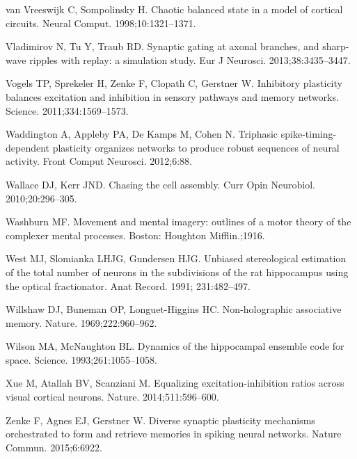 \begin{thebibliography}{}
van Vreeswijk C, Sompolinsky H.
\newblock Chaotic balanced state in a model of cortical circuits.
\newblock Neural Comput. 1998;10:1321--1371.


Vladimirov N, Tu Y, Traub RD. 
\newblock Synaptic gating at axonal branches, and sharp-wave ripples with replay: a simulation study.
\newblock Eur J Neurosci. 2013;38:3435--3447.

Vogels TP, Sprekeler H, Zenke F, Clopath C, Gerstner W.
\newblock Inhibitory plasticity balances excitation and inhibition in sensory
  pathways and memory networks.
\newblock Science. 2011;334:1569--1573.

Waddington A, Appleby PA, De Kamps M, Cohen N.
\newblock Triphasic spike-timing-dependent plasticity organizes networks to produce robust sequences of neural activity.
\newblock Front Comput Neurosci. 2012;6:88.

Wallace DJ, Kerr JND.
\newblock Chasing the cell assembly.
\newblock Curr Opin Neurobiol. 2010;20:296--305.

Washburn MF.
\newblock Movement and mental imagery: outlines of a motor theory of the
  complexer mental processes.
\newblock Boston: Houghton Mifflin.;1916.

West MJ, Slomianka LHJG, Gundersen HJG.
\newblock Unbiased stereological estimation of the total number of neurons in the subdivisions of the rat hippocampus using the optical fractionator.
\newblock Anat Record. 1991; 231:482--497.

Willshaw DJ, Buneman OP, Longuet-Higgins HC.
\newblock Non-holographic associative memory.
\newblock Nature. 1969;222:960--962.

Wilson MA, McNaughton BL.
\newblock Dynamics of the hippocampal ensemble code for space.
\newblock Science. 1993;261:1055--1058.

Xue M, Atallah BV, Scanziani M.
\newblock Equalizing excitation-inhibition ratios across visual cortical
  neurons.
\newblock Nature. 2014;511:596--600.

Zenke F, Agnes EJ, Gerstner W.
\newblock Diverse synaptic plasticity mechanisms orchestrated to form and retrieve memories in spiking neural networks.
\newblock Nature Commun. 2015;6:6922.

\end{thebibliography}

